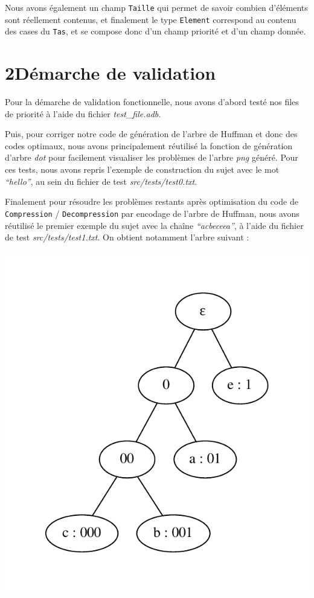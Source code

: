\documentclass [a4paper,11pt] {report}
\begin{document}
Nous avons également un champ \lstinline!Taille! qui permet de savoir combien d'éléments sont réellement contenus, et finalement le type \lstinline!Element! correspond au contenu des cases du \lstinline!Tas!, et se compose donc d'un champ priorité et d'un champ donnée.





\section* {2\hspace{5mm}Démarche de validation }

Pour la démarche de validation fonctionnelle, nous avons d'abord testé nos files de priorité à l'aide du fichier \textit{test\_file.adb}.

Puis, pour corriger notre code de génération de l'arbre de Huffman et donc des codes optimaux, nous avons principalement réutilisé la fonction de génération d'arbre \textit{dot} pour facilement visualiser les problèmes de l'arbre \textit{png} généré. Pour ces tests, nous avons repris l'exemple de construction du sujet avec le mot \textit{``hello''}, au sein du fichier de test \textit{src/tests/test0.txt}.

Finalement pour résoudre les problèmes restants après optimisation du code de \lstinline!Compression! / \lstinline!Decompression! par encodage de l'arbre de Huffman, nous avons réutilisé le premier exemple du sujet avec la chaîne \textit{``acbeceea''}, à l'aide du fichier de test \textit{src/tests/test1.txt}. On obtient notamment l'arbre suivant :

\begin{center}
  \includegraphics[scale=0.75]{test1.pdf}
\end{center}
\end{document}
